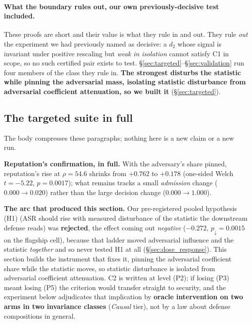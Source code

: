 \documentclass{article}
\begin{document}
\paragraph{What the boundary rules out, our own previously-decisive test included.} These proofs are short and their value is what they rule in and out. They rule \emph{out} the experiment we had previously named as decisive: a $d_2$ whose signal is invariant under positive rescaling but \emph{weak in isolation} cannot satisfy C1 in scope, so no such certified pair exists to test. \S\ref{sec:targeted}--\S\ref{sec:validation} run four members of the class they rule in. \textbf{The strongest disturbs the statistic while pinning the adversarial mass, isolating statistic disturbance from adversarial coefficient attenuation, so we built it} (\S\ref{sec:targeted}).

\subsection{The targeted suite in full}
\label{app:targeted_full}

The body compresses these paragraphs; nothing here is a new claim or a new run.

\textbf{Reputation's confirmation, in full.} With the adversary's share pinned, reputation's rise at $\rho{=}54.6$ shrinks from $+0.762$ to $+0.178$ (one-sided Welch $t{=}{-}5.22$, $p{=}0.0017$); what remains tracks a small \emph{admission} change ($0.000\to0.020$) rather than the large decision change ($0.000\to1.000$).

\textbf{The arc that produced this section.} Our pre-registered pooled hypothesis (H1) (ASR should rise with measured disturbance of the statistic the downstream defense reads) was \textbf{rejected}, the effect coming out \emph{negative} ($-0.272$, $p_{\downarrow}{=}0.0015$ on the flagship cell), because that ladder moved adversarial influence and the statistic \emph{together} and so never tested H1 at all (\S\ref{sec:dose_response}). This section builds the instrument that fixes it, pinning the adversarial coefficient share while the statistic moves, so statistic disturbance is isolated from adversarial coefficient attenuation. C2 is written at level (P2); if losing (P3) meant losing (P5) the criterion would transfer straight to security, and the experiment below adjudicates that implication by \textbf{oracle intervention on two arms in two invariance classes} (\emph{Causal} tier), not by a law about defense compositions in general.
\end{document}
